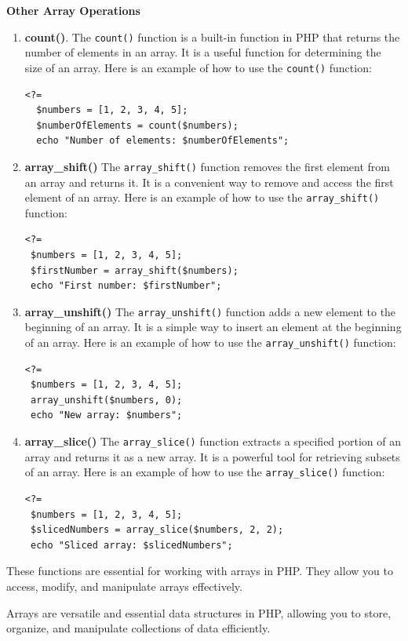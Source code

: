 \documentclass[11pt]{article}
\begin{document}
\textbf{Other Array Operations}
\begin{enumerate}
\item \textbf{count()}.
The \texttt{count()} function is a built-in function in PHP that returns the
number of elements in an array. It is a useful function for
determining the size of an array. Here is an example of how to use the
\texttt{count()} function:
\begin{verbatim}
<?=
  $numbers = [1, 2, 3, 4, 5];
  $numberOfElements = count($numbers);
  echo "Number of elements: $numberOfElements";
\end{verbatim}

\item \textbf{array\_shift()}
The \texttt{array\_shift()} function removes the first element from an array and
returns it. It is a convenient way to remove and access the first
element of an array. Here is an example of how to use the
\texttt{array\_shift()} function:
\begin{verbatim}
<?=
 $numbers = [1, 2, 3, 4, 5];
 $firstNumber = array_shift($numbers);
 echo "First number: $firstNumber";
\end{verbatim}

\item \textbf{array\_unshift()}
The \texttt{array\_unshift()} function adds a new element to the beginning of an
array. It is a simple way to insert an element at the beginning of an
array. Here is an example of how to use the \texttt{array\_unshift()} function:
\begin{verbatim}
<?=
 $numbers = [1, 2, 3, 4, 5];
 array_unshift($numbers, 0);
 echo "New array: $numbers";
\end{verbatim}

\item \textbf{array\_slice()}
The \texttt{array\_slice()} function extracts a specified portion of an array
and returns it as a new array. It is a powerful tool for retrieving
subsets of an array. Here is an example of how to use the
\texttt{array\_slice()} function:
\begin{verbatim}
<?=
 $numbers = [1, 2, 3, 4, 5];
 $slicedNumbers = array_slice($numbers, 2, 2);
 echo "Sliced array: $slicedNumbers";
\end{verbatim}
\end{enumerate}

These functions are essential for working with arrays in PHP. They allow
you to access, modify, and manipulate arrays effectively.

Arrays are versatile and essential data structures in PHP, allowing you
to store, organize, and manipulate collections of data efficiently.
\end{document}
